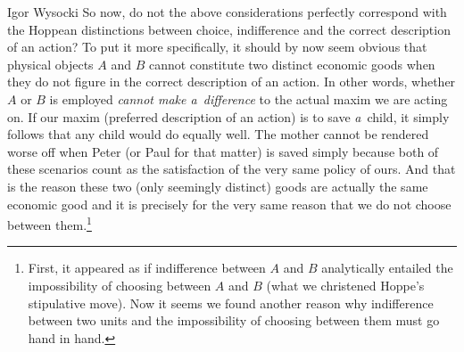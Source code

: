 \begin{artengenv}{Igor Wysocki}
So now, do not the above considerations perfectly correspond with the Hoppean distinctions between choice, indifference and the correct description of an action? To put it more specifically, it should by now seem obvious that physical objects $A$ and $B$ cannot constitute two distinct economic goods when they do not figure in the correct description of an action. In other words, whether $A$ or $B$ is employed \textit{cannot make a~difference} to the actual maxim we are acting on. If our maxim (preferred description of an action) is to save \textit{a}~child, it simply follows that any child would do equally well. The mother cannot be rendered worse off when Peter (or Paul for that matter) is saved simply because both of these scenarios count as the satisfaction of the very same policy of ours. And that is the reason these two (only seemingly distinct) goods are actually the same economic good and it is precisely for the very same reason that we do not choose between them.\footnote{First, it appeared as if indifference between $A$ and $B$ analytically entailed the impossibility of choosing between $A$ and $B$ (what we christened Hoppe's stipulative move). Now it seems we found another reason why indifference between two units and the impossibility of choosing between them must go hand in hand.}


\end{artengenv}
